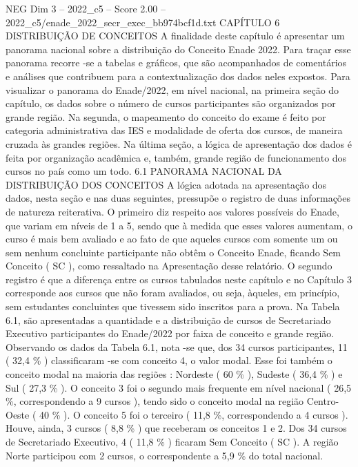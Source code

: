 \begin{textsample}{NEG Dim 3 – 2022\_c5 – Score 2.00 – 2022\_c5/enade\_2022\_secr\_exec\_bb974bcf1d.txt}  \label{ex:f3_neg_218}
CAPÍTULO 6 DISTRIBUIÇÃO DE CONCEITOS A finalidade deste capítulo é apresentar um panorama nacional sobre a distribuição do Conceito Enade 2022.
Para traçar esse panorama recorre -se a tabelas e gráficos, que são acompanhados de comentários e análises que contribuem para a contextualização dos dados neles expostos.
Para visualizar o panorama do Enade/2022, em nível nacional, na primeira seção do capítulo, os dados sobre o número de cursos participantes são organizados por grande região.
Na segunda, o mapeamento do conceito do exame é feito por categoria administrativa das IES e modalidade de oferta dos cursos, de maneira cruzada às grandes regiões.
Na última seção, a lógica de apresentação dos dados é feita por organização acadêmica e, também, grande região de funcionamento dos cursos no país como um todo. 6.1 PANORAMA NACIONAL DA DISTRIBUIÇÃO DOS CONCEITOS A lógica adotada na apresentação dos dados, nesta seção e nas duas seguintes, pressupõe o registro de duas informações de natureza reiterativa.
O primeiro diz respeito aos valores possíveis do Enade, que variam em níveis de 1 a 5, sendo que à medida que esses valores aumentam, o curso é mais bem avaliado e ao fato de que aqueles cursos com somente um ou sem nenhum concluinte participante não obtêm o Conceito Enade, ficando Sem Conceito ( SC ), como ressaltado na Apresentação desse relatório.
O segundo registro é que a diferença entre os cursos tabulados neste capítulo e no Capítulo 3 corresponde aos cursos que não foram avaliados, ou seja, àqueles, em princípio, sem estudantes concluintes que tivessem sido inscritos para a prova.
Na Tabela 6.1, são apresentadas a quantidade e a distribuição de cursos de Secretariado Executivo participantes do Enade/2022 por faixa de conceito e grande região.
Observando os dados da Tabela 6.1, nota -se que, dos 34 cursos participantes, 11 ( 32,4 \% ) classificaram -se com conceito 4, o valor modal.
Esse foi também o conceito modal na maioria das regiões : Nordeste ( 60 \% ), Sudeste ( 36,4 \% ) e Sul ( 27,3 \% ).
O conceito 3 foi o segundo mais frequente em nível nacional ( 26,5 \%, correspondendo a 9 cursos ), tendo sido o conceito modal na região Centro-Oeste ( 40 \% ).
O conceito 5 foi o terceiro ( 11,8 \%, correspondendo a 4 cursos ).
Houve, ainda, 3 cursos ( 8,8 \% ) que receberam os conceitos 1 e 2.
Dos 34 cursos de Secretariado Executivo, 4 ( 11,8 \% ) ficaram Sem Conceito ( SC ).
A região Norte participou com 2 cursos, o correspondente a 5,9 \% do total nacional.

\end{textsample}

